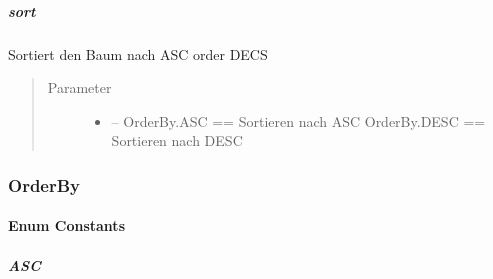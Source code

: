 \documentclass[letterpaper,10pt,ngerman]{sphinxmanual}
\begin{document}
\subparagraph{sort}
\label{\detokenize{com/linuxluigi/edu/list/Listlabel:sort}}

\begin{fulllineitems}
\label{\detokenize{com/linuxluigi/edu/list/Listlabel:com.linuxluigi.edu.list.Listlabel.sort(OrderBy)}}
Sortiert den Baum nach ASC order DECS
\begin{quote}\begin{description}
\item[{Parameter}] \leavevmode\begin{itemize}
\item {} 
 -- OrderBy.ASC == Sortieren nach ASC OrderBy.DESC == Sortieren nach DESC

\end{itemize}

\end{description}\end{quote}

\end{fulllineitems}



\subsubsection{OrderBy}
\label{\detokenize{com/linuxluigi/edu/list/OrderBy::doc}}\label{\detokenize{com/linuxluigi/edu/list/OrderBy:orderby}}

\begin{fulllineitems}
\label{\detokenize{com/linuxluigi/edu/list/OrderBy:com.linuxluigi.edu.list.OrderBy}}
\end{fulllineitems}



\paragraph{Enum Constants}
\label{\detokenize{com/linuxluigi/edu/list/OrderBy:enum-constants}}

\subparagraph{ASC}
\label{\detokenize{com/linuxluigi/edu/list/OrderBy:asc}}

\begin{fulllineitems}
\label{\detokenize{com/linuxluigi/edu/list/OrderBy:com.linuxluigi.edu.list.OrderBy.ASC}}
\end{fulllineitems}
\end{document}

